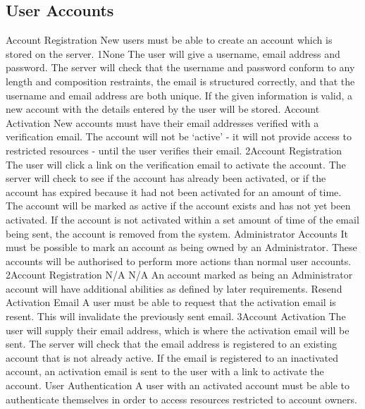 	\subsection{User Accounts} %
		\funcreq %
			{Account Registration}
			{New users must be able to create an account which is stored on 
			the server.}
			{1}{None}
			{The user will give a username, email address and password.}
			{The server will check that the username and password conform 
			to any length and composition restraints, the email is structured 
			correctly, and that the username and email address are both unique.
			}
			{If the given information is valid, a new account with the details 
			entered by the user will be stored.}
		\funcreq %
			{Account Activation}
			{New accounts must have their email addresses verified with a 
			verification email. The account will not be `active' - it will not 
			provide access to restricted resources - until the user verifies 
			their email.}
			{2}{Account Registration}
			{The user will click a link on the verification email to activate 
			the account.}
			{The server will check to see if the account has already been 
			activated, or if the account has expired because it had not been 
			activated for an amount of time.}
			{The account will be marked as active if the account exists and 
			has not yet been activated. If the account is not activated 
			within a set amount of time of the email being sent, the account 
			is removed from the system.}
		\funcreq %
			{Administrator Accounts}
			{It must be possible to mark an account as being owned by an 
			Administrator. These accounts will be authorised to perform more 
			actions than normal user accounts.}
			{2}{Account Registration}
			{N/A}
			{N/A}
			{An account marked as being an Administrator account will have 
			additional abilities as defined by later requirements.}
		\funcreq %
			{Resend Activation Email}
			{A user must be able to request that the activation email is
			resent. This will invalidate the previously sent email.}
			{3}{Account Activation}
			{The user will supply their email address, which is where the 
			activation email will be sent.}
			{The server will check that the email address is registered to an 
			existing account that is not already active.}
			{If the email is registered to an inactivated account, an 
			activation email is sent to the user with a link to activate the 
			account.}
		\funcreq %
			{User Authentication}
			{A user with an activated account must be able to authenticate 
			themselves in order to access resources restricted to account 
			owners.}

